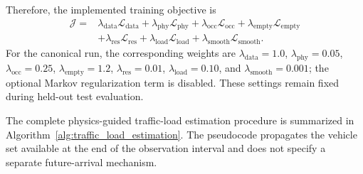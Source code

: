 \documentclass[journal]{IEEEtran}
\begin{document}
{\color{blue}
Therefore, the implemented training objective is
\begin{equation}
\begin{aligned}
\mathcal{J}
={}&
\lambda_{\mathrm{data}}\mathcal{L}_{\mathrm{data}}
+
\lambda_{\mathrm{phy}}\mathcal{L}_{\mathrm{phy}}
+
\lambda_{\mathrm{occ}}\mathcal{L}_{\mathrm{occ}}
+
\lambda_{\mathrm{empty}}\mathcal{L}_{\mathrm{empty}}
\\
&+
\lambda_{\mathrm{res}}\mathcal{L}_{\mathrm{res}}
+
\lambda_{\mathrm{load}}\mathcal{L}_{\mathrm{load}}
+
\lambda_{\mathrm{smooth}}\mathcal{L}_{\mathrm{smooth}}.
\end{aligned}
\end{equation}
For the canonical run, the corresponding weights are $\lambda_{\mathrm{data}}=1.0$, $\lambda_{\mathrm{phy}}=0.05$, $\lambda_{\mathrm{occ}}=0.25$, $\lambda_{\mathrm{empty}}=1.2$, $\lambda_{\mathrm{res}}=0.01$, $\lambda_{\mathrm{load}}=0.10$, and $\lambda_{\mathrm{smooth}}=0.001$; the optional Markov regularization term is disabled. These settings remain fixed during held-out test evaluation.
}

The complete physics-guided traffic-load estimation procedure is summarized in Algorithm~\ref{alg:traffic_load_estimation}. The pseudocode propagates the vehicle set available at the end of the observation interval and does not specify a separate future-arrival mechanism.
\end{document}
